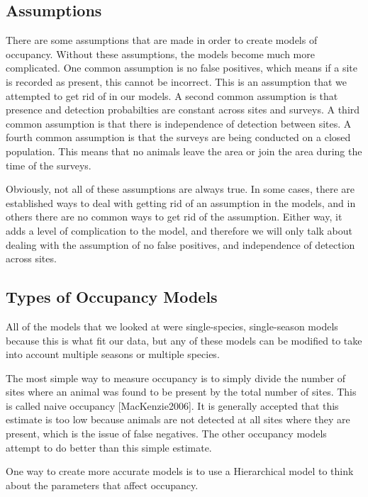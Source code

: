 \documentclass{article}
\begin{document}
	\subsection{Assumptions}

	There are some assumptions that are made in order to create models of 
occupancy.  Without these assumptions, the models become much more complicated.
One common assumption is no false positives, which means if a site is recorded as
present, this cannot be incorrect.  This is an assumption that we attempted to 
get rid of in our models.  A second common assumption is that presence and 
detection probabilties are constant across sites and surveys.  A third common 
assumption is that there is independence of detection between sites.  A fourth
common assumption is that the surveys are being conducted on a closed population.
This means that no animals leave the area or join the area during the time of the
surveys.  

	Obviously, not all of these assumptions are always true.  In some cases, there
are established ways to deal with getting rid of an assumption in the models, 
and in others there are no common ways to get rid of the assumption.  Either way, 
it adds a level of complication to the model, and therefore we will only talk 
about dealing with the assumption of no false positives, and independence of 
detection across sites.

	\subsection{Types of Occupancy Models}

		All of the models that we looked at were single-species, single-season
models because this is what fit our data, but any of these models can be modified
to take into account multiple seasons or multiple species.  

	The most simple way to measure occupancy is to simply divide the number 
of sites where an animal was found to be present by the total number of sites.  
This is called naive occupancy [MacKenzie2006].  It is generally accepted that 
this estimate is too low because animals are not detected at all sites where they
are present, which is the issue of false negatives.  The other occupancy models
attempt to do better than this simple estimate.

	One way to create more accurate models is to use a Hierarchical model to 
think about the parameters that affect occupancy.  
			
\end{document}
